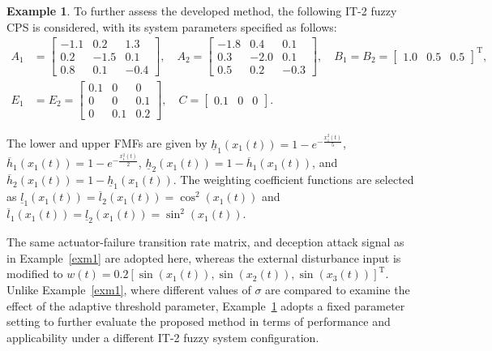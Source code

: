 \documentclass[preprint,review,fleqn,sort&compress,3p]{elsarticle}
\theoremstyle{definition} %
\theoremstyle{definition}%
\newtheorem{example}{Example}
\begin{document}
	\begin{example}\label{exm2}
		To further assess the developed method, the following IT-2 fuzzy CPS is considered, with its system parameters specified as follows:
		\begin{align*}
			A_1 &= \begin{bmatrix}
				-1.1 & 0.2 & 1.3 \\
				0.2 & -1.5 & 0.1 \\
				0.8 & 0.1 & -0.4
			\end{bmatrix}, \quad
			A_2 = \begin{bmatrix}
				-1.8 & 0.4 & 0.1 \\
				0.3 & -2.0 & 0.1 \\
				0.5 & 0.2 & -0.3
			\end{bmatrix}, \quad
			B_1 = B_2 = \begin{bmatrix} 1.0 & 0.5 & 0.5 \end{bmatrix}^{\mathrm{T}}, \\
			E_1 &= E_2 =
			\begin{bmatrix}
				0.1 & 0 & 0 \\
				0 & 0 & 0.1 \\
				0 & 0.1 & 0.2
			\end{bmatrix}, \quad
			C = \begin{bmatrix} 0.1 & 0 & 0 \end{bmatrix}.
		\end{align*}
		
		The lower and upper FMFs are given by $\underline{h}_1(x_1(t)) = 1 - e^{-\frac{x_1^2(t)}{5}}$, $\overline{h}_1(x_1(t)) = 1 - e^{-\frac{x_1^2(t)}{2}}$, $\underline{h}_2(x_1(t)) = 1 - \overline{h}_1(x_1(t))$, and $\overline{h}_2(x_1(t)) = 1 - \underline{h}_1(x_1(t))$. The weighting coefficient functions are selected as $\underline{l}_1(x_1(t))=\overline{l}_2(x_1(t))=\cos^{2}(x_1(t))$ and $\overline{l}_1(x_1(t))=\underline{l}_2(x_1(t))=\sin^{2}(x_1(t))$. 
		
		The same actuator-failure transition rate matrix, and deception attack signal as in Example~\ref{exm1} are adopted here, whereas the external disturbance input is modified to $w(t) = 0.2[\sin(x_1(t)),\sin(x_2(t)),\sin(x_3(t))]^{\mathrm{T}}$. Unlike Example~\ref{exm1}, where different values of $\sigma$ are compared to examine the effect of the adaptive threshold parameter, Example~\ref{exm2} adopts a fixed parameter setting to further evaluate the proposed method in terms of performance and applicability under a different IT-2 fuzzy system configuration.
		

\end{example}
\end{document}
